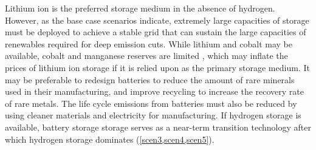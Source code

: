 Lithium ion is the preferred storage medium in the absence of hydrogen. However, as the base case scenarios indicate, extremely large capacities of storage must be deployed to achieve a stable grid that can sustain the large capacities of renewables required for deep emission cuts. While lithium and cobalt may be available, cobalt and manganese reserves are limited \cite{scrosati_lithium-ion_2011,simon_potential_2015,turcheniuk_ten_2018} , which may inflate the prices of lithium ion storage if it is relied upon as the primary storage medium. It may be preferable to redesign batteries to reduce the amount of rare minerals used in their manufacturing, and improve recycling to increase the recovery rate of rare metals. The life cycle emissions from batteries must also be reduced by using cleaner materials and electricity for manufacturing. If hydrogen storage is available, battery storage storage serves as a near-term transition technology after which hydrogen storage dominates (\ref{scen3,scen4,scen5}).

